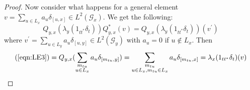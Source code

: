 \begin{proof}
Now consider what happens for a general element $v = \sum_{u \in L_{x}} a_{u}\delta_{[u,x]} \in L^{2}(\mathcal{G}_{x})$. We get the following:
\begin{equation}\label{eqn:LE3}
Q_{y,x}(\lambda_{y}(1_{tt^{*}}\delta_{t}))Q_{y,x}^{*}(v)=Q_{y,x}(\lambda_{y}(1_{tt^{*}}\delta_{t}))(v^{'})
\end{equation}
where $v^{'}= \sum_{u \in L_{y}} a_{u}\delta_{[u,y]} \in L^{2}(\mathcal{G}_{y})$ with $a_{u}=0$ if $u \not \in L_{x}$. Then 
\begin{eqnarray*}
\mbox{(\ref{eqn:LE3})} = Q_{y,x}(\sum_{\substack{ m_{tu}\\ u \in L_{x}}} a_{u}\delta_{[m_{tu},y]})
=\sum_{\substack{ m_{tu}\\  u \in L_{x},m_{tu} \in L_{x}}}a_{u}\delta_{[m_{tu},x]}=\lambda_{x}(1_{tt^{*}}\delta_{t})(v)
\end{eqnarray*}
\end{proof}

